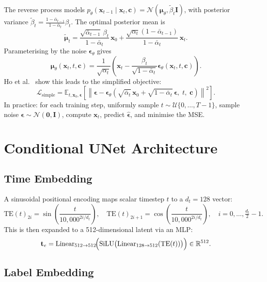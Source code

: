 \documentclass[12pt, a4paper]{report}
\begin{document}
The reverse process models
$p_\theta(\mathbf{x}_{t-1}\mid\mathbf{x}_t, \mathbf{c})
  = \mathcal{N}(\bm\mu_\theta, \tilde\beta_t\mathbf{I})$,
with posterior variance
$\tilde\beta_t = \frac{1-\bar\alpha_{t-1}}{1-\bar\alpha_t}\beta_t$.
The optimal posterior mean is
\[
  \tilde{\bm\mu}_t
    = \frac{\sqrt{\bar\alpha_{t-1}}\,\beta_t}{1-\bar\alpha_t}\,\mathbf{x}_0
    + \frac{\sqrt{\alpha_t}(1-\bar\alpha_{t-1})}{1-\bar\alpha_t}\,\mathbf{x}_t.
\]
Parameterising by the noise $\boldsymbol\epsilon_\theta$ gives
\[
  \bm\mu_\theta(\mathbf{x}_t,t,\mathbf{c})
    = \frac{1}{\sqrt{\alpha_t}}\!\left(
        \mathbf{x}_t
        - \frac{\beta_t}{\sqrt{1-\bar\alpha_t}}
          \boldsymbol\epsilon_\theta(\mathbf{x}_t,t,\mathbf{c})
      \right).
\]
Ho et al.~\cite{ho2020ddpm} show this leads to the simplified objective:
\[
  \mathcal{L}_{\text{simple}}
    = \mathbb{E}_{t,\mathbf{x}_0,\boldsymbol\epsilon}\!\left[
        \left\|\boldsymbol\epsilon
          - \boldsymbol\epsilon_\theta\!\left(
              \sqrt{\bar\alpha_t}\,\mathbf{x}_0
              + \sqrt{1-\bar\alpha_t}\,\boldsymbol\epsilon,\;
              t,\; \mathbf{c}
            \right)\right\|^2
      \right].
\]
In practice: for each training step, uniformly sample $t \sim \mathcal{U}\{0,\ldots,T{-}1\}$,
sample noise $\boldsymbol\epsilon \sim \mathcal{N}(\mathbf{0},\mathbf{I})$, compute
$\mathbf{x}_t$, predict $\hat{\boldsymbol\epsilon}$, and minimise the MSE.

\section{Conditional UNet Architecture}

\subsection{Time Embedding}

A sinusoidal positional encoding maps scalar timestep $t$ to a $d_t = 128$ vector:
\[
  \mathrm{TE}(t)_{2i}   = \sin\!\left(\frac{t}{10{,}000^{2i/d_t}}\right),\quad
  \mathrm{TE}(t)_{2i+1} = \cos\!\left(\frac{t}{10{,}000^{2i/d_t}}\right),\quad
  i = 0,\ldots,\tfrac{d_t}{2}-1.
\]
This is then expanded to a 512-dimensional latent via an MLP:
\[
  \mathbf{t}_e
    = \mathrm{Linear}_{512\to512}\!\Bigl(
        \mathrm{SiLU}\bigl(
          \mathrm{Linear}_{128\to512}(\mathrm{TE}(t))
        \bigr)
      \Bigr) \in \mathbb{R}^{512}.
\]

\subsection{Label Embedding}
\end{document}
